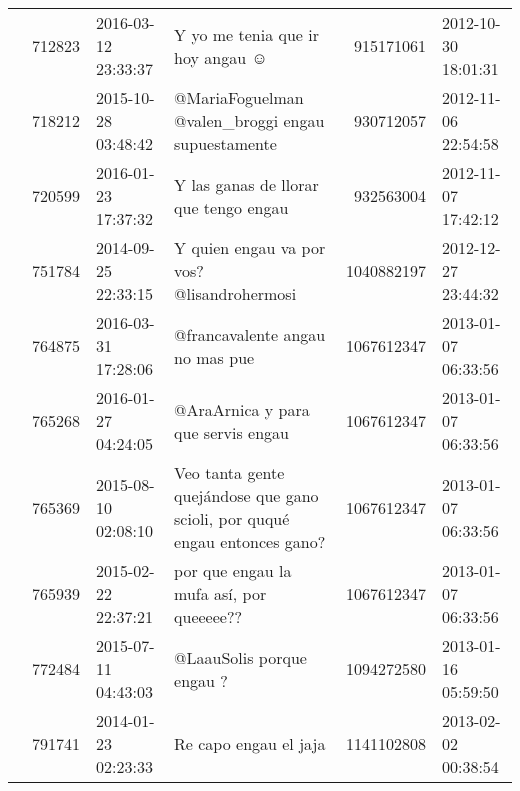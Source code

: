 \begin{tabular}{llllrl}
           & 712823  & 2016-03-12 23:33:37 &                                                                                                             Y yo me tenia que ir hoy angau ☺ &   915171061 & 2012-10-30 18:01:31 \\
           & 718212  & 2015-10-28 03:48:42 &                                                                                            @MariaFoguelman @valen\_broggi engau supuestamente &   930712057 & 2012-11-06 22:54:58 \\
           & 720599  & 2016-01-23 17:37:32 &                                                                                                        Y las ganas de llorar que tengo engau &   932563004 & 2012-11-07 17:42:12 \\
           & 751784  & 2014-09-25 22:33:15 &                                                                                                   Y quien engau va por vos? @lisandrohermosi &  1040882197 & 2012-12-27 23:44:32 \\
           & 764875  & 2016-03-31 17:28:06 &                                                                                                              @francavalente angau no mas pue &  1067612347 & 2013-01-07 06:33:56 \\
           & 765268  & 2016-01-27 04:24:05 &                                                                                                           @AraArnica y para que servis engau &  1067612347 & 2013-01-07 06:33:56 \\
           & 765369  & 2015-08-10 02:08:10 &                                                                   Veo tanta gente quejándose que gano scioli, por ququé engau entonces gano? &  1067612347 & 2013-01-07 06:33:56 \\
           & 765939  & 2015-02-22 22:37:21 &                                                                                                     por que engau la mufa así, por queeeee?? &  1067612347 & 2013-01-07 06:33:56 \\
           & 772484  & 2015-07-11 04:43:03 &                                                                                                                    @LaauSolis porque engau ? &  1094272580 & 2013-01-16 05:59:50 \\
           & 791741  & 2014-01-23 02:23:33 &                                                                                                                        Re capo engau el jaja &  1141102808 & 2013-02-02 00:38:54 \\

\end{tabular}
